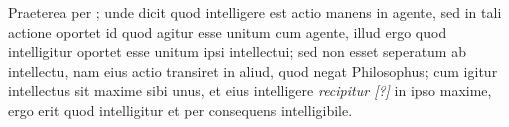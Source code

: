 
\pstart%
Praeterea per ;  unde dicit quod intelligere est actio
manens in agente,  sed in tali actione oportet id quod agitur esse
unitum cum agente, illud ergo quod intelligitur oportet esse unitum
ipsi intellectui;  sed non esset seperatum ab intellectu, nam eius
actio transiret in aliud, quod negat Philosophus;  cum igitur
intellectus sit maxime sibi unus, et eius intelligere \emph{recipitur [?]} in
ipso maxime, ergo erit quod intelligitur et per consequens intelligibile.%
\pend
